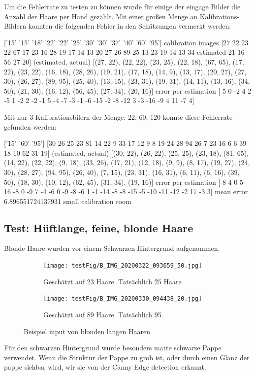 \documentclass[german,a4paper, 12pt]{llncs}
\begin{document}
Um die Fehlerrate zu testen zu können wurde für einige der eingage Bilder die Anzahl der Haare per Hand gezählt.
Mit einer großen Menge an Kalibrations-Bildern konnten die folgenden Fehler in den Schätzungen vermerkt werden:
 
['15' '15' '18' '22' '22' '25' '30' '30' '37' '40' '60' '95'] calibration images
[27 22 23 22 67 17 23 16 28 19 17 14 13 20 27 26 89 25 13 23 19 14 13 34 estimated
21 16 56 27 20]
(estimated, actual)
[(27, 22), (22, 22), (23, 25), (22, 18), (67, 65), (17, 22), (23, 22), (16, 18), (28, 26), (19, 21), (17, 18), (14, 9), (13, 17), (20, 27), (27, 30), (26, 27), (89, 95), (25, 40), (13, 15), (23, 31), (19, 31), (14, 11), (13, 16), (34, 50), (21, 30), (16, 12), (56, 45), (27, 34), (20, 16)]
error per estimation [  5   0  -2   4   2  -5   1  -2   2  -2  -1   5  -4  -7  -3  -1  -6 -15
-2  -8 -12   3  -3 -16  -9   4  11  -7   4]


Mit nur 3 Kalibrationsbilern der Menge: 22, 60, 120 konnte diese Fehlerrate gefunden werden:

['15' '60' '95']
[30 26 25 23 81 14 22  9 33 17 12  9  8 19 24 28 94 26  7 23 16  6  6 39
18 10 62 31 19]
(estimated, actual)
[(30, 22), (26, 22), (25, 25), (23, 18), (81, 65), (14, 22), (22, 22), (9, 18), (33, 26), (17, 21), (12, 18), (9, 9), (8, 17), (19, 27), (24, 30), (28, 27), (94, 95), (26, 40), (7, 15), (23, 31), (16, 31), (6, 11), (6, 16), (39, 50), (18, 30), (10, 12), (62, 45), (31, 34), (19, 16)]
error per estimation [  8   4   0   5  16  -8   0  -9   7  -4  -6   0  -9  -8  -6   1  -1 -14
-8  -8 -15  -5 -10 -11 -12  -2  17  -3   3]
mean error 6.896551724137931
small calibration room

\subsection{Test: Hüftlange, feine, blonde Haare}

Blonde Haare wurden vor einem Schwarzen Hintergrund aufgenommen. 

\begin{figure}
	\centering
	\begin{subfigure}[b]{0.475\textwidth}
		\centering
		\texttt{[image: testFig/B\_IMG\_20200322\_093659\_50.jpg]}
		\caption[]{Geschätzt auf 23 Haare. Tatsächlich 25 Haare}
		\label{img:tstM1} 
	\end{subfigure}
	\hfill
	\begin{subfigure}[b]{0.475\textwidth} 
		\centering
		\texttt{[image: testFig/B\_IMG\_20200330\_094438\_20.jpg]}
		\caption[]{Geschätzt auf 89 Haare. Tatsächlich 95.}
		\label{img:tstM2}
	\end{subfigure}
	\caption[  ]
	{\small Beispiel input von blonden langen Haaren} 
	\label{img:tstM}
\end{figure}
Für den schwarzen Hintergrund wurde besonders matte schwarze Pappe verwendet. Wenn die Struktur der Pappe zu grob ist, oder durch einen Glanz der pappe sichbar wird, wir sie von der Canny Edge detection erkannt. 
\end{document}
